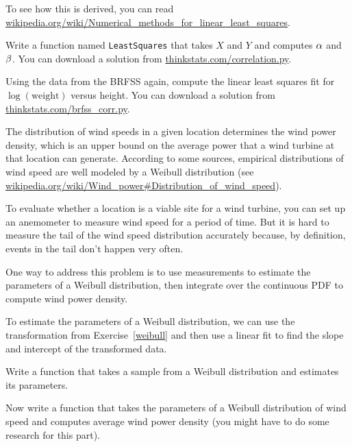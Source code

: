 \documentclass[12pt]{book}
\begin{document}
To see how this is derived, you can read
\url{wikipedia.org/wiki/Numerical_methods_for_linear_least_squares}.


\begin{exercise}
Write a function named {\tt LeastSquares} that takes $X$ and $Y$ and
computes $\alpha$ and $\beta$.  You can download a solution from
\url{thinkstats.com/correlation.py}.


\end{exercise}

\begin{exercise}
Using the data from the BRFSS again, compute the linear least squares
fit for $\log(\mathrm{weight})$ versus height.  You can download a
solution from \url{thinkstats.com/brfss_corr.py}.



\end{exercise}


\begin{exercise}
The distribution of wind speeds in a given location determines the
wind power density, which is an upper bound on the average power that
a wind turbine at that location can generate.  According to some
sources, empirical distributions of wind speed are well modeled by a
Weibull distribution (see
\url{wikipedia.org/wiki/Wind_power#Distribution_of_wind_speed}).



To evaluate whether a location is a viable site for a wind turbine,
you can set up an anemometer to measure wind speed for a period of
time.  But it is hard to measure the tail of the wind speed distribution
accurately because, by definition, events in the tail don't happen
very often.


One way to address this problem is to use measurements to estimate the
parameters of a Weibull distribution, then integrate over the
continuous PDF to compute wind power density.


To estimate the parameters of a Weibull distribution, we can use the
transformation from Exercise~\ref{weibull} and then use a linear fit
to find the slope and intercept of the transformed data.

Write a function that takes a sample from a Weibull distribution and
estimates its parameters.

Now write a function that takes the parameters of a Weibull distribution
of wind speed and computes average wind power density (you might have
to do some research for this part).

\end{exercise}
\end{document}
